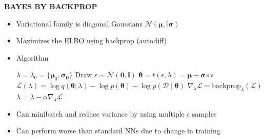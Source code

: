 \begin{whitebox}{\textbf{BAYES BY BACKPROP}}
    \begin{itemize}
        \item Variational family is diagonal Gaussians $\mathcal{N}(\bm{\mu},\mathbb{I}\bm{\sigma})$
        \item Maximizes the ELBO using backprop (autodiff)
        \item Algorithm
        \begin{center}
            \begin{algorithmic}
                \footnotesize
                \State $\lambda=\lambda_0=\{\bm{\mu}_0,\bm{\sigma_0}\}$
                \State Draw $\epsilon\sim\mathcal{N}(\bm{0},\mathbb{I})$
                \State $\bm{\theta}=t(\epsilon,\lambda)=\bm{\mu}+\bm{\sigma}\circ\epsilon$
                \State $\mathcal{L}(\lambda)=\log q(\bm{\theta};\lambda)-\log p(\bm{\theta})-\log p(\mathcal{D}\mid\bm{\theta})$
                \State $\nabla_\lambda\mathcal{L}=\mathrm{backprop}_\lambda(\mathcal{L})$
                \State $\lambda=\lambda-\alpha\nabla_\lambda\mathcal{L}$
                \EndFor
            \end{algorithmic}
        \end{center}
        \item Can minibatch and reduce variance by using multiple $\epsilon$ samples
        \item Can perform worse than standard NNs due to change in training
    \end{itemize}
\end{whitebox}

